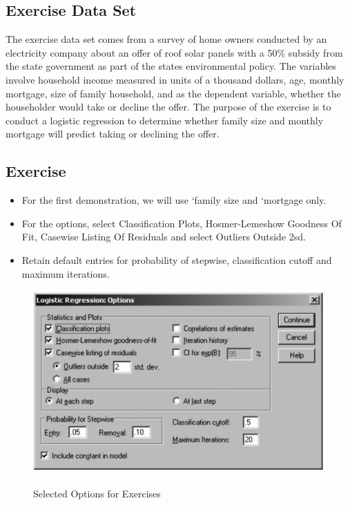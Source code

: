 \documentclass[a4paper,12pt]{article}
\begin{document}
\subsection*{Exercise Data Set}
The exercise data set comes from a survey of home owners
conducted by an electricity company about an offer of roof solar panels with a 50\% subsidy
from the state government as part of the states environmental policy. The variables involve
household income measured in units of a thousand dollars, age, monthly mortgage, size of
family household, and as the dependent variable, whether the householder would take or decline the offer.
The purpose of the exercise is to conduct a logistic regression to determine whether family
size and monthly mortgage will predict taking or declining the offer.

\subsection*{Exercise}
\begin{itemize}
	\item For the first demonstration, we will use `family size and
	`mortgage only. 
	\item For the options, select Classification Plots, Hosmer-Lemeshow Goodness
	Of Fit, Casewise Listing Of Residuals and select Outliers Outside 2sd. 
		\item 
	Retain default
	entries for probability of stepwise, classification cutoff and maximum iterations.
\end{itemize}


\begin{figure}[h!]
\begin{center}
  \includegraphics[scale=0.8]{images/Logistic10}\\
  \caption{Selected Options for Exercises}
\end{center}
\end{figure}
\end{document}

